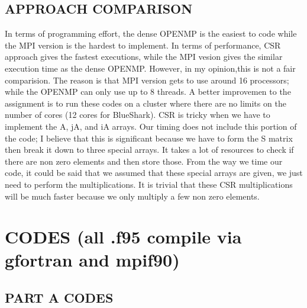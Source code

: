 \documentclass[12pt]{article}
\begin{document}
   \subsection{APPROACH COMPARISON}
   In terms of programming effort, the dense OPENMP is the easiest to code while the MPI version is the hardest to implement. In terms of performance, CSR approach gives the fastest executions, while the MPI vesion gives the similar execution time as the dense OPENMP. However, in my opinion,this is not a fair comparision. The reason is that MPI version gets to use around 16 processors; while the OPENMP can only use up to 8 threads. A better improvemen to the assignment is to run these codes on a cluster where there are no limits on the number of cores (12 cores for BlueShark). CSR is tricky when we have to implement the A, jA, and iA arrays.  Our timing does not include this portion of the code; I believe that this is significant because we have to form the S matrix then break it down to three special arrays.  It takes a lot of resources to check if there are non zero elements and then store those.  From the way we time our code, it could be said that we assumed that these special arrays are given, we just need to perform the multiplications.  It is trivial that these CSR multiplications will be much faster because we only multiply a few non zero elements. 

   \newpage
   \section{CODES (all .f95 compile via gfortran and mpif90)}
   \subsection{PART A CODES}
\end{document}
